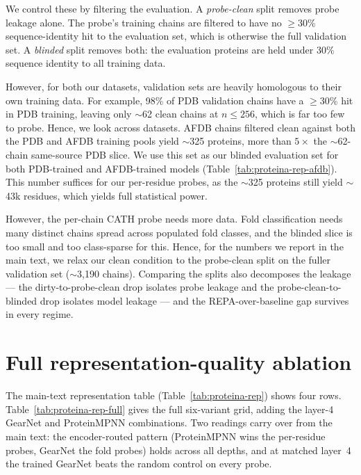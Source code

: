 \documentclass[12pt,a4paper,twoside]{report}
\begin{document}
We control these by filtering the evaluation. A \emph{probe-clean} split removes probe leakage alone. The probe's training chains are filtered to have no $\ge$30\% sequence-identity hit to the evaluation set, which is otherwise the full validation set. A \emph{blinded} split removes both: the evaluation proteins are held under 30\% sequence identity to all training data.

However, for both our datasets, validation sets are heavily homologous to their own training data. For example, 98\% of PDB validation chains have a $\ge$30\% hit in PDB training, leaving only $\sim$62 clean chains at $n{\le}256$, which is far too few to probe. Hence, we look across datasets. AFDB chains filtered clean against both the PDB and AFDB training pools yield $\sim$325 proteins, more than $5\times$ the $\sim$62-chain same-source PDB slice. We use this set as our blinded evaluation set for both PDB-trained and AFDB-trained models (Table~\ref{tab:proteina-rep-afdb}). This number suffices for our per-residue probes, as the $\sim$325 proteins still yield $\sim$43k residues, which yields full statistical power.

However, the per-chain CATH probe needs more data. Fold classification needs many distinct chains spread across populated fold classes, and the blinded slice is too small and too class-sparse for this. Hence, for the numbers we report in the main text, we relax our clean condition to the probe-clean split on the fuller validation set ($\sim$3{,}190 chains). Comparing the splits also decomposes the leakage --- the dirty-to-probe-clean drop isolates probe leakage and the probe-clean-to-blinded drop isolates model leakage --- and the REPA-over-baseline gap survives in every regime.

\section{Full representation-quality ablation}
\label{app:rep-full}

The main-text representation table (Table~\ref{tab:proteina-rep}) shows four rows. Table~\ref{tab:proteina-rep-full} gives the full six-variant grid, adding the layer-4 GearNet and ProteinMPNN combinations. Two readings carry over from the main text: the encoder-routed pattern (ProteinMPNN wins the per-residue probes, GearNet the fold probes) holds across all depths, and at matched layer~4 the trained GearNet beats the random control on every probe.


\end{document}
